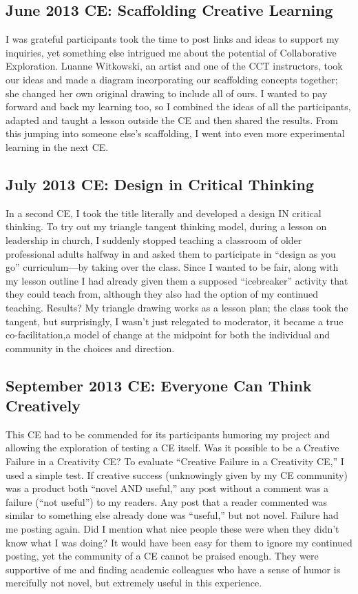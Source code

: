 \subsection{June 2013 CE: Scaffolding Creative Learning}

I was grateful participants took the time to post links and ideas to
support my inquiries, yet something else intrigued me about the
potential of Collaborative Exploration. Luanne Witkowski, an artist and
one of the CCT instructors, took our ideas and made a diagram
incorporating our scaffolding concepts together; she changed her own
original drawing to include all of ours. I wanted to pay forward and
back my learning too, so I combined the ideas of all the participants,
adapted and taught a lesson outside the CE and then shared the results.
From this jumping into someone else's scaffolding, I went into even more
experimental learning in the next CE.

\subsection{July 2013 CE: Design in Critical Thinking}

In a second CE, I took the title literally and developed a design IN
critical thinking. To try out my triangle tangent thinking model, during
a lesson on leadership in church, I suddenly stopped teaching a
classroom of older professional adults halfway in and asked them to
participate in ``design as you go'' curriculum---by taking over the
class. Since I wanted to be fair, along with my lesson outline I had
already given them a supposed ``icebreaker'' activity that they could
teach from, although they also had the option of my continued teaching.
Results? My triangle drawing works as a lesson plan; the class took the
tangent, but surprisingly, I wasn't just relegated to moderator, it
became a true co-facilitation,a model of change at the midpoint for both
the individual and community in the choices and direction.

\subsection{September 2013 CE: Everyone Can Think Creatively}

This CE had to be commended for its participants humoring my project and
allowing the exploration of testing a CE itself. Was it possible to be a
Creative Failure in a Creativity CE? To evaluate ``Creative Failure in a
Creativity CE,'' I used a simple test. If creative success (unknowingly
given by my CE community) was a product both ``novel AND useful,'' any
post without a comment was a failure (``not useful'') to my readers. Any
post that a reader commented was similar to something else already done
was ``useful,'' but not novel. Failure had me posting again. Did I
mention what nice people these were when they didn't know what I was
doing? It would have been easy for them to ignore my continued posting,
yet the community of a CE cannot be praised enough. They were supportive
of me and finding academic colleagues who have a sense of humor is
mercifully not novel, but extremely useful in this experience.


